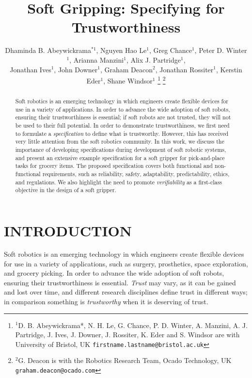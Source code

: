 \documentclass[letterpaper, 10 pt, conference]{ieeeconf}  %
\title{\LARGE \bf
	Soft Gripping: Specifying for Trustworthiness
}
\author{Dhaminda B. Abeywickrama$^{*1}$, Nguyen Hao Le$^{1}$, Greg Chance$^{1}$,  Peter D. Winter$^{1}$, Arianna Manzini$^{1}$, Alix J. Partridge$^{1}$, \\Jonathan Ives$^{1}$, John Downer$^{1}$, Graham Deacon$^{2}$, Jonathan Rossiter$^{1}$, Kerstin Eder$^{1}$, Shane Windsor$^{1}$%
\thanks{$^{1}$D. B. Abeywickrama*, N. H. Le, G. Chance, P. D. Winter, A. Manzini, A. J. Partridge, J. Ives, J. Downer, J. Rossiter,  K. Eder and S. Windsor are with University of Bristol, UK
	{\tt\small firstname.lastname@bristol.ac.uk}}%
\thanks{$^{2}$G. Deacon is with the Robotics Research Team, Ocado Technology, UK
	{\tt\small graham.deacon@ocado.com}}%
}
\begin{document}
	
	
	
	\maketitle
	\thispagestyle{empty}
	\pagestyle{empty}
	
	
	\begin{abstract}
	Soft robotics is an emerging technology in which engineers create flexible devices for use in a variety of applications.
	In order to advance the wide adoption of soft robots, ensuring their trustworthiness is essential; if soft robots are not trusted, they will not be used to their full potential. 
	In order to demonstrate trustworthiness, we first need to formulate a \emph{specification} to define what is trustworthy. However, this has received very little attention from the soft robotics community. 
	In this work, we discuss the importance of developing specifications during development of soft robotic systems, and present an extensive example specification for a soft gripper for pick-and-place tasks for grocery items. The proposed specification covers both functional and non-functional requirements, such as reliability, safety, adaptability, predictability, ethics, and regulations.  
	We also highlight the need to promote \emph{verifiability} as a first-class objective in the design of a soft gripper.		
	\end{abstract}
	
	\section{INTRODUCTION}\label{introduction}
	
	Soft robotics is an emerging technology in which engineers create flexible devices for use in a variety of applications, such as surgery, prosthetics, space exploration, and grocery picking. 
	In order to advance the wide adoption of soft robots, ensuring their trustworthiness is essential. 
	\emph{Trust} may vary, as it can be gained and lost over time, and different research disciplines define trust in different ways; in comparison something is \emph{trustworthy} when it is deserving of trust.
	
\end{document}
